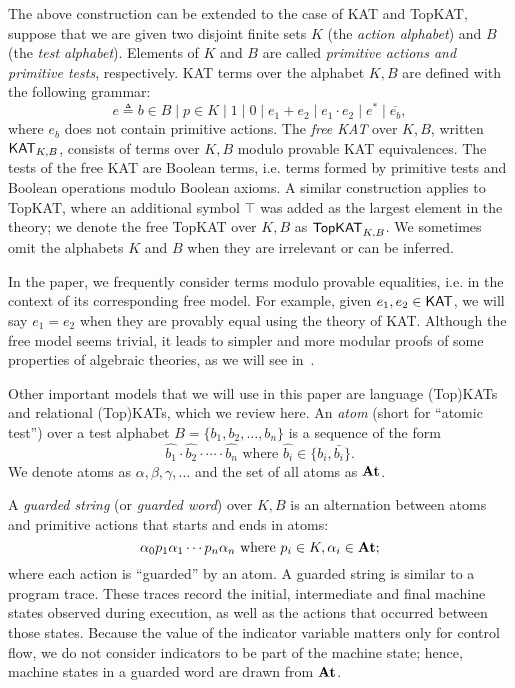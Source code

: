 The above construction can be extended to the case of KAT and TopKAT, 
suppose that we are given two disjoint finite sets $K$ (the
\emph{action alphabet}) and $B$ (the \emph{test alphabet}).  Elements of $K$ and
$B$ are called \emph{primitive actions and primitive tests}, respectively. 
KAT terms over the alphabet \(K, B\) are defined with the following grammar:
\[e  ≜  b  ∈  B  ∣  p  ∈  K  ∣  1  ∣  0  ∣  e_1 + e_2  ∣  e_1  ⋅  e_2  ∣  e^*  ∣  \overline{e_b},\]
where \(e_b\) does not contain primitive actions.
The \emph{free KAT} over \(K, B\), written $\mathsf{KAT}_{K,B}$, 
consists of terms over \(K, B\) modulo provable KAT equivalences.  
The tests of the free KAT are Boolean terms, i.e. terms formed by
primitive tests and Boolean operations modulo Boolean axioms.  A similar
construction applies to TopKAT, where an additional symbol \( ⊤ \) was added 
as the largest element in the theory; we denote the free TopKAT over $K,B$ as
\(\mathsf{TopKAT}_{K, B}\).  We sometimes omit the alphabets \(K\) and \(B\) when they
are irrelevant or can be inferred.

In the paper, we frequently consider terms modulo provable equalities, i.e. in the
context of its corresponding free model.  For example, given \(e_1, e_2  \in  \mathsf{KAT}\),
we will say \(e_1 = e_2\) when they are provably equal using the theory of KAT.
Although the free model seems trivial, it leads to simpler and more modular
proofs of some properties of algebraic theories, as we will see in~.

Other important models that we will use in this paper are language (Top)KATs and
relational (Top)KATs, which we review here.  An \emph{atom} (short for ``atomic
test'') over a test alphabet \(B = \{b_{1}, b_{2},  \ldots , b_{n}\}\) is a sequence of the form
\[\hat{b_{1}}  \cdot  \hat{b_{2}}  \cdot   \cdots   \cdot \hat{b_{n}} \text{ where } \hat{b_{i}}  \in  \{b_{i}, \bar{b_{i}}\}.\] 
We denote atoms as \( \alpha ,  \beta ,  \gamma ,  \ldots \) and the set of all atoms as \(\mathbf{At}\).

A \emph{guarded string} (or \emph{guarded word}) over \(K, B\) is an alternation 
between atoms and primitive actions that starts and ends in atoms: 
\[ \alpha _{0}p_{1} \alpha _{1}  \cdots  p_{n}  \alpha _{n} \text{ where } p_{i}  \in  K,  \alpha _{i}  \in  \mathbf{At};\] 
where each action is ``guarded'' by an atom.
A guarded string is similar to a program trace. These traces record the initial, intermediate and final machine states observed during execution, as well as the actions that occurred between those states. %
Because the value of the indicator variable matters only for control flow, we do not consider indicators to be part of the machine state; hence, machine states in a guarded word are drawn from $\mathbf{At}$.

